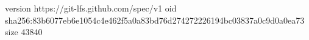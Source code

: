 version https://git-lfs.github.com/spec/v1
oid sha256:83b6077eb6e1054c4e462f5a0a83bd76d274272226194bc03837a0c9d0a0ea73
size 43840
